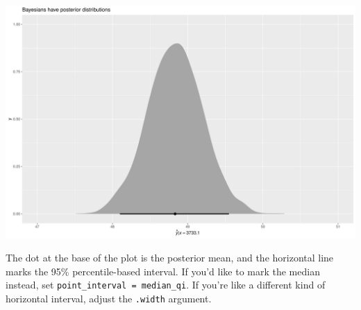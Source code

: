 \documentclass[
  letterpaper,
  DIV=11,
  numbers=noendperiod]{scrartcl}
\begin{document}
\includegraphics{Bayes_Lab_1_files/figure-pdf/unnamed-chunk-45-1.pdf}

The dot at the base of the plot is the posterior mean, and the
horizontal line marks the 95\% percentile-based interval. If you'd like
to mark the median instead, set \texttt{point\_interval\ =\ median\_qi}.
If you're like a different kind of horizontal interval, adjust the
\texttt{.width} argument.
\end{document}
